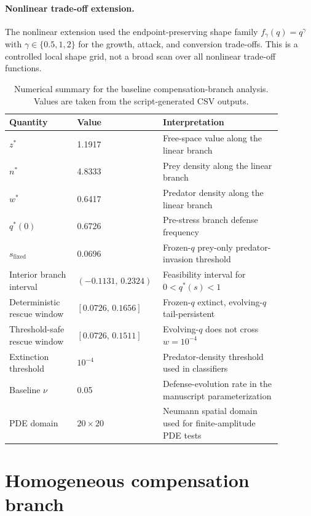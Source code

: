 \documentclass[11pt]{article}
\begin{document}
\paragraph{Nonlinear trade-off extension.}
The nonlinear extension used the endpoint-preserving shape family \(f_\gamma(q)=q^\gamma\) with \(\gamma\in\{0.5,1,2\}\) for the growth, attack, and conversion trade-offs. This is a controlled local shape grid, not a broad scan over all nonlinear trade-off functions.

\begin{table}[htbp]
  \centering
  \caption{Numerical summary for the baseline compensation-branch analysis. Values are taken from the script-generated CSV outputs.}
  \label{tab:numerical-summary}
  \small
  \begin{tabular}{L{0.24\linewidth}L{0.22\linewidth}L{0.42\linewidth}}
    \toprule
    Quantity & Value & Interpretation \\
    \midrule
    \(z^*\) & 1.1917 & Free-space value along the linear branch \\
    \(n^*\) & 4.8333 & Prey density along the linear branch \\
    \(w^*\) & 0.6417 & Predator density along the linear branch \\
    \(q^*(0)\) & 0.6726 & Pre-stress branch defense frequency \\
    \(s_{\mathrm{fixed}}\) & 0.0696 & Frozen-\(q\) prey-only predator-invasion threshold \\
    Interior branch interval & \((-0.1131,\,0.2324)\) & Feasibility interval for \(0<q^*(s)<1\) \\
    Deterministic rescue window & \([0.0726,\,0.1656]\) & Frozen-\(q\) extinct, evolving-\(q\) tail-persistent \\
    Threshold-safe rescue window & \([0.0726,\,0.1511]\) & Evolving-\(q\) does not cross \(w=10^{-4}\) \\
    Extinction threshold & \(10^{-4}\) & Predator-density threshold used in classifiers \\
    Baseline \(\nu\) & 0.05 & Defense-evolution rate in the manuscript parameterization \\
    PDE domain & \(20\times20\) & Neumann spatial domain used for finite-amplitude PDE tests \\
    \bottomrule
  \end{tabular}
\end{table}

\section{Homogeneous compensation branch}
\end{document}
